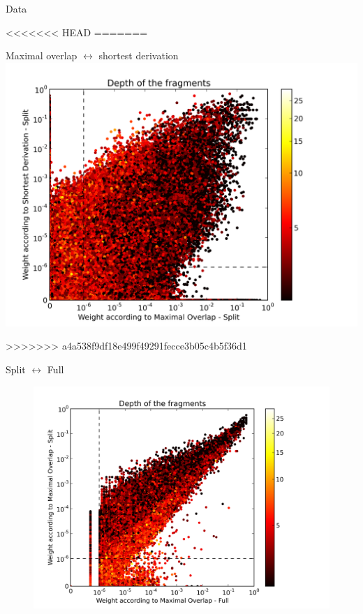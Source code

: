 \documentclass{beamer}
\begin{document}
\begin{frame}{Data}
\begin{itemize}
<<<<<<< HEAD
=======
\begin{frame}{Maximal overlap $\leftrightarrow$ shortest derivation}
\includegraphics[width=\linewidth,trim=0.5cm 0cm 2.5cm 0.5cm, clip=true]{../data/plots/0.png}
\end{frame}
>>>>>>> a4a538f9df18e499f49291fecce3b05c4b5f36d1

\begin{frame}{Split $\leftrightarrow$ Full}
\begin{figure}
\includegraphics[width=\textwidth,trim=0.5cm 0cm 2.5cm 0.5cm, clip=true]{../data/plots/2.png}
\end{figure}
\end{frame}



\end{itemize}
\end{frame}
\end{document}
